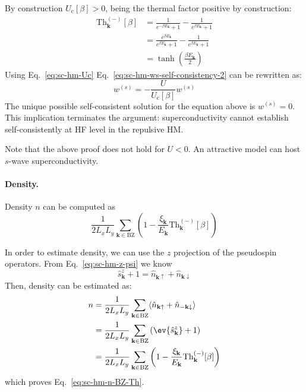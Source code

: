 \begin{tabproof}
	By construction $U_\mathrm{c}[\beta] > 0$, being the thermal factor positive by construction:
	\[
	\begin{aligned}
		\mathrm{Th}_\mathbf{k}^{(-)}[\beta] &= \frac{1}{e^{-\beta E_\mathbf{k}}+1} - \frac{1}{e^{\beta E_\mathbf{k}}+1} \\
		&= \frac{e^{\beta E_\mathbf{k}}}{e^{\beta E_\mathbf{k}}+1} - \frac{1}{e^{\beta E_\mathbf{k}}+1} \\
		&= \tanh(\frac{\beta E_\mathbf{k}}{2}) 
	\end{aligned}
	\]
	Using Eq.~\eqref{eq:sc-hm-Uc}
	Eq.~\eqref{eq:sc-hm-ws-self-consistency-2} can be rewritten as:
	\[
		w^{(s)} = -\frac{U}{U_\mathrm{c}[\beta]} w^{(s)}
	\]
	The unique possible self-consistent solution for the equation above is $w^{(s)}=0$. This implication terminates the argument: superconductivity cannot establish self-consistently at HF level in the repulsive HM. 
\end{tabproof}	
Note that the above proof does not hold for $U<0$. An attractive model can host $s$-wave superconductivity.

\paragraph{Density.}

Density $n$ can be computed as
\begin{equation}\label{eq:sc-hm-n-BZ-Th}
	\frac{1}{2L_x L_y} \sum_{\mathbf{k} \in \mathrm{BZ}} \left(
	1-\frac{\xi_\mathbf{k}}{E_\mathbf{k}}  \mathrm{Th}_\mathbf{k}^{(-)}[\beta]
	\right)
\end{equation}

\begin{tabproof}

	In order to estimate density, we can use the $z$ projection of the pseudospin operators. From Eq.~\eqref{eq:sc-hm-z-psi} we know
	\[
		\hat s_\mathbf{k}^z+1 = \hat n_{\mathbf{k}\uparrow} + \hat n_{\mathbf{k}\downarrow} 
	\]
	Then, density can be estimated as:
	\[
	\begin{aligned}
		n &= \frac{1}{2L_x L_y} \sum_{\mathbf{k} \in \mathrm{BZ}} \langle 
		\hat n_{\mathbf{k}\uparrow} + \hat n_{-\mathbf{k}\downarrow} 
		\rangle \\
		&= \frac{1}{2L_x L_y} \sum_{\mathbf{k} \in \mathrm{BZ}} \left(
			\ev{\hat s_\mathbf{k}^z}+1
		\right) \\
		&= \frac{1}{2L_x L_y} \sum_{\mathbf{k} \in \mathrm{BZ}} \left(
			1-\frac{\xi_\mathbf{k}}{E_\mathbf{k}}  \mathrm{Th}_\mathbf{k}^{(-)}[\beta]
		\right)
	\end{aligned}
	\]
	which proves Eq.~\eqref{eq:sc-hm-n-BZ-Th}.

\end{tabproof}


